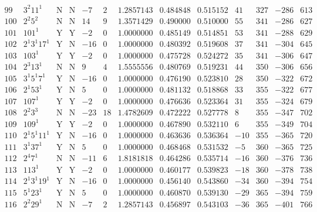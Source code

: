 \documentclass[11pt,reqno,a4letter]{article}
\numberwithin{equation}{section}
\numberwithin{figure}{section}
\numberwithin{table}{section}
\theoremstyle{plain}
\numberwithin{theorem}{section}
\theoremstyle{definition}
\begin{document}
\begin{table}[ht]
\begin{equation*}
{\begin{array}{cc|cc|ccc|cc|cccc}
 99 & 3^2 11^1 & \text{N} & \text{N} & -7 & 2 & 1.2857143 & 0.484848 & 0.515152 & 41 & 327 & -286 & 613 \\
 100 & 2^2 5^2 & \text{N} & \text{N} & 14 & 9 & 1.3571429 & 0.490000 & 0.510000 & 55 & 341 & -286 & 627 \\
 101 & 101^1 & \text{Y} & \text{Y} & -2 & 0 & 1.0000000 & 0.485149 & 0.514851 & 53 & 341 & -288 & 629 \\
 102 & 2^1 3^1 17^1 & \text{Y} & \text{N} & -16 & 0 & 1.0000000 & 0.480392 & 0.519608 & 37 & 341 & -304 & 645 \\
 103 & 103^1 & \text{Y} & \text{Y} & -2 & 0 & 1.0000000 & 0.475728 & 0.524272 & 35 & 341 & -306 & 647 \\
 104 & 2^3 13^1 & \text{N} & \text{N} & 9 & 4 & 1.5555556 & 0.480769 & 0.519231 & 44 & 350 & -306 & 656 \\
 105 & 3^1 5^1 7^1 & \text{Y} & \text{N} & -16 & 0 & 1.0000000 & 0.476190 & 0.523810 & 28 & 350 & -322 & 672 \\
 106 & 2^1 53^1 & \text{Y} & \text{N} & 5 & 0 & 1.0000000 & 0.481132 & 0.518868 & 33 & 355 & -322 & 677 \\
 107 & 107^1 & \text{Y} & \text{Y} & -2 & 0 & 1.0000000 & 0.476636 & 0.523364 & 31 & 355 & -324 & 679 \\
 108 & 2^2 3^3 & \text{N} & \text{N} & -23 & 18 & 1.4782609 & 0.472222 & 0.527778 & 8 & 355 & -347 & 702 \\
 109 & 109^1 & \text{Y} & \text{Y} & -2 & 0 & 1.0000000 & 0.467890 & 0.532110 & 6 & 355 & -349 & 704 \\
 110 & 2^1 5^1 11^1 & \text{Y} & \text{N} & -16 & 0 & 1.0000000 & 0.463636 & 0.536364 & -10 & 355 & -365 & 720 \\
 111 & 3^1 37^1 & \text{Y} & \text{N} & 5 & 0 & 1.0000000 & 0.468468 & 0.531532 & -5 & 360 & -365 & 725 \\
 112 & 2^4 7^1 & \text{N} & \text{N} & -11 & 6 & 1.8181818 & 0.464286 & 0.535714 & -16 & 360 & -376 & 736 \\
 113 & 113^1 & \text{Y} & \text{Y} & -2 & 0 & 1.0000000 & 0.460177 & 0.539823 & -18 & 360 & -378 & 738 \\
 114 & 2^1 3^1 19^1 & \text{Y} & \text{N} & -16 & 0 & 1.0000000 & 0.456140 & 0.543860 & -34 & 360 & -394 & 754 \\
 115 & 5^1 23^1 & \text{Y} & \text{N} & 5 & 0 & 1.0000000 & 0.460870 & 0.539130 & -29 & 365 & -394 & 759 \\
 116 & 2^2 29^1 & \text{N} & \text{N} & -7 & 2 & 1.2857143 & 0.456897 & 0.543103 & -36 & 365 & -401 & 766 \\

\end{array}}
\end{equation*}
\end{table}
\end{document}
